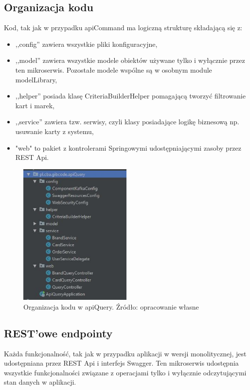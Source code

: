 \subsection{Organizacja kodu}
Kod, tak jak w przypadku apiCommand ma logiczną strukturę składającą się z:
\begin{itemize}
    \item ,,config'' zawiera wszystkie pliki konfiguracyjne,
    \item ,,model'' zawiera wszystkie modele obiektów używane tylko i wyłącznie przez ten mikroserwis. Pozostałe modele wspólne są w osobnym module modelLibrary,
    \item ,,helper'' posiada klasę CriteriaBuilderHelper pomagającą tworzyć filtrowanie kart i marek,
    \item ,,service'' zawiera tzw. serwisy, czyli klasy posiadające logikę biznesową np. usuwanie karty z systemu,
    \item "web" to pakiet z kontrolerami Springowymi udostępniającymi zasoby przez REST Api.
\end{itemize}

\begin{figure}[h!]
  \centering
    \includegraphics[width=0.5\textwidth]{images/apiQuery_packages.JPG}
  \caption{Organizacja kodu w apiQuery. Źródło: opracowanie własne }
\end{figure}
\FloatBarrier

\subsection{REST'owe endpointy}
Każda funkcjonalność, tak jak w przypadku aplikacji w wersji monolitycznej, jest udostępniana przez REST Api i interfejs Swagger.
Ten mikroserwis udostępnia wszystkie funkcjonalności związane z operacjami tylko i wyłącznie odczytującymi stan danych w aplikacji.

